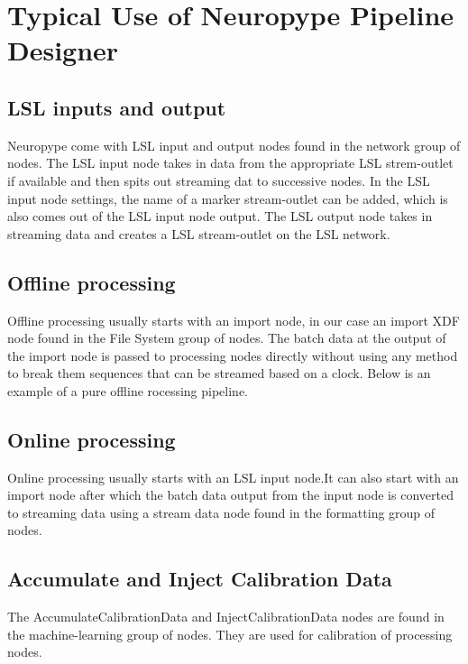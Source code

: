 \documentclass[16pt]{book}
\begin{document}
\chapter{Typical Use of Neuropype Pipeline Designer}
\section{LSL inputs and output}
\par\noindent Neuropype come with LSL input and output nodes found in the network group of nodes.
The LSL input node takes in data from the appropriate LSL strem-outlet if available and then spits out streaming dat to
successive nodes. In the LSL input node settings, the name of a marker stream-outlet can be added, which is also comes 
out of the LSL input node output.
The LSL output node takes in streaming data and creates a LSL stream-outlet on the LSL network. 
\section{Offline processing}
\par\noindent Offline processing usually starts with an import node, in our case an import XDF node found in the File System group of nodes.
The batch data at the output of the import node is passed to processing nodes directly without using any method to break them sequences 
that can be streamed based on a clock. Below is an example of a pure offline rocessing pipeline.
\section{Online processing}
\par\noindent Online processing usually starts with an LSL input node.It can also start with an import node after which the batch data output from the input node
is converted to streaming data using a stream data node found in the formatting group of nodes.
\section{Accumulate and Inject Calibration Data}
\par\noindent The AccumulateCalibrationData and InjectCalibrationData nodes are found in the machine-learning group of nodes. They are used for calibration of processing nodes.
\end{document}

